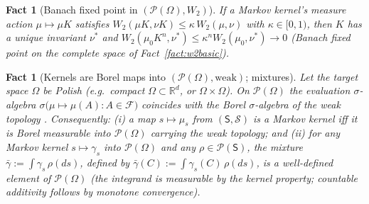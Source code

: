 \documentclass[11pt]{article}
\theoremstyle{definitionbreak}
\theoremstyle{plainbreak}
\newtheorem{fact}[theorem]{Fact}
\theoremstyle{remarkbreak}
\newcommand{\R}{\mathbb{R}}
\newcommand{\cF}{\mathcal{F}}
\newcommand{\cP}{\mathcal{P}}
\newcommand{\Om}{\Omega}
\begin{document}
\begin{fact}[Banach fixed point in $(\cP(\Om),W_2)$]
\label{fact:banachw2}
If a Markov kernel's measure action $\mu\mapsto\mu K$ satisfies $W_2(\mu K,\nu K)\le\kappa\,W_2(\mu,\nu)$
with $\kappa\in[0,1)$, then $K$ has a unique invariant $\nu^\ast$ and
$W_2(\mu_0K^n,\nu^\ast)\le\kappa^n W_2(\mu_0,\nu^\ast)\to0$ (Banach fixed point on the complete space
of Fact~\ref{fact:w2basic}).
\end{fact}

\begin{fact}[Kernels are Borel maps into $(\cP(\Om),\mathrm{weak})$; mixtures]
\label{fact:kernmeas}
Let the target space $\Om$ be Polish (e.g.\ compact $\Om\subset\R^d$, or $\Om\times\Om$). On
$\cP(\Om)$ the evaluation $\sigma$-algebra $\sigma\big(\mu\mapsto\mu(A):A\in\cF\big)$ coincides with
the Borel $\sigma$-algebra of the weak topology \cite[Chs.~1 and 4]{Kallenberg}. Consequently:
(i) a map $s\mapsto\mu_s$ from $(\mathsf S,\mathcal S)$ is a Markov kernel \emph{iff} it is Borel
measurable into $\cP(\Om)$ carrying the weak topology; and
(ii) for any Markov kernel $s\mapsto\gamma_s$ into $\cP(\Om)$ and any $\rho\in\cP(\mathsf S)$, the
\emph{mixture} $\bar\gamma:=\int\gamma_s\,\rho(ds)$, defined by $\bar\gamma(C):=\int\gamma_s(C)\,\rho(ds)$,
is a well-defined element of $\cP(\Om)$ (the integrand is measurable by the kernel property;
countable additivity follows by monotone convergence).
\end{fact}
\end{document}
